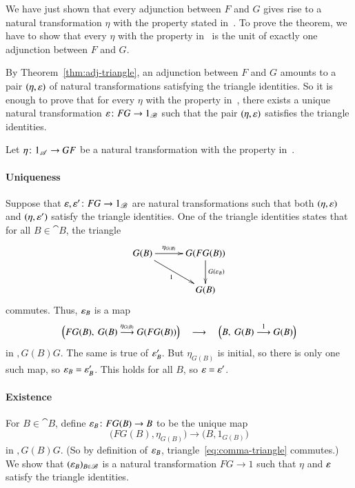 \begin{pf}
We have just shown that every adjunction between $F$ and $G$ gives rise to
a natural transformation $\eta$ with the property stated
in~.  To prove the theorem, we have to show that
every $\eta$ with the property in~ is the unit of
exactly one adjunction between $F$ and $G$.

By Theorem~\ref{thm:adj-triangle}, an adjunction between $F$ and $G$
amounts to a pair $(\eta, \varepsilon)$ of natural transformations satisfying
the triangle identities.  So it is enough to prove that for every $\eta$
with the property in~, there exists a unique
natural transformation $\epsln\from FG \to 1_\cat{B}$ such that the pair
$(\eta, \varepsilon)$ satisfies the triangle identities.

Let $\eta\from 1_\cat{A} \to GF$ be a natural transformation with the property
in~.

\paragraph*{Uniqueness} 
Suppose that $\epsln, \epsln'\from FG \to 1_\cat{B}$ are natural
transformations such that both $(\eta, \varepsilon)$ and $(\eta, \varepsilon')$
satisfy the triangle identities.  One of the triangle identities states
that for all $B \in \cat{B}$, the triangle
% 
\begin{equation}        
\label{eq:comma-triangle}
\begin{array}{c}
\xymatrix@C+1ex{
G(B) \ar[r]^-{\eta_{G(B)}} \ar[rd]_1    &
G(FG(B)) \ar[d]^{G(\epsln_B)}   \\
        &G(B)
}
\end{array}
\end{equation}
% 
commutes.  Thus, $\varepsilon_B$ is a map 
\[
\Bigl( FG(B), \ G(B) \stackrel{\eta_{G(B)}}{\longrightarrow} G(FG(B)) \Bigr)
\quad
\longrightarrow
\quad 
\Bigl( B, \ G(B) \stackrel{1}{\longrightarrow} G(B) \Bigr)
\]
in $\comma{G(B)}{G}$.  The same is true of $\varepsilon'_B$.  But $\eta_{G(B)}$ is
initial, so there is only one such map, so $\varepsilon_B = \varepsilon'_B$.  This holds
for all $B$, so $\varepsilon = \varepsilon'$.

\paragraph*{Existence}  
For $B \in \cat{B}$, define $\epsln_B\from FG(B) \to B$ to be the unique map
\[
\bigl(FG(B), \eta_{G(B)}\bigr) 
\to 
\bigl(B, 1_{G(B)}\bigr)
\]
in $\comma{G(B)}{G}$.  (So by definition of $\varepsilon_B$,
triangle~\eqref{eq:comma-triangle} commutes.)  We show that $(\varepsilon_B)_{B
  \in \mathscr{B}}$ is a natural transformation $FG \to 1$ such that $\eta$ and
$\varepsilon$ satisfy the triangle identities.


\end{pf}
